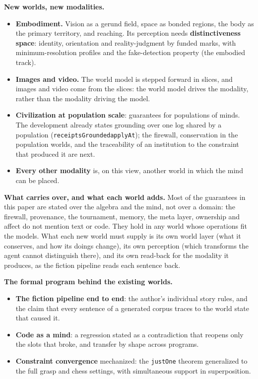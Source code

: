 \documentclass[11pt]{article}
\newcommand{\leanus}{\textunderscore\allowbreak}
\newcommand{\lean}[1]{{\let\_\leanus\texttt{#1}}}
\theoremstyle{remark}
\begin{document}
\textbf{New worlds, new modalities.}
\begin{itemize}[nosep]
    \item \textbf{Embodiment.} Vision as a gerund field, space as bonded regions, the body
    as the primary territory, and reaching. Its perception needs \textbf{distinctiveness
    space}: identity, orientation and reality-judgment by funded marks, with
    minimum-resolution profiles and the fake-detection property (the embodied track).
    \item \textbf{Images and video.} The world model is stepped forward in slices, and images
    and video come from the slices: the world model drives the modality, rather than the
    modality driving the model.
    \item \textbf{Civilization at population scale}: guarantees for populations of minds.
    The development already states grounding over one log shared by a population
    (\lean{receiptsGrounded\_applyAt}); the firewall, conservation in the population worlds,
    and the traceability of an institution to the constraint that produced it are next.
    \item \textbf{Every other modality} is, on this view, another world in which the mind
    can be placed.
\end{itemize}

\textbf{What carries over, and what each world adds.} Most of the guarantees in this paper
are stated over the algebra and the mind, not over a domain: the firewall, provenance, the
tournament, memory, the meta layer, ownership and affect do not mention text or code. They
hold in any world whose operations fit the models. What each new world must supply is its
own world layer (what it conserves, and how its doings change), its own perception (which
transforms the agent cannot distinguish there), and its own read-back for the modality it
produces, as the fiction pipeline reads each sentence back.

\textbf{The formal program behind the existing worlds.}
\begin{itemize}[nosep]
    \item \textbf{The fiction pipeline end to end}: the author's individual story rules, and
    the claim that every sentence of a generated corpus traces to the world state that
    caused it.
    \item \textbf{Code as a mind}: a regression stated as a contradiction that reopens only
    the slots that broke, and transfer by shape across programs.
    \item \textbf{Constraint convergence} mechanized: the \lean{justOne} theorem
    generalized to the full grasp and chess settings, with simultaneous support in
    superposition.
\end{itemize}
\end{document}
